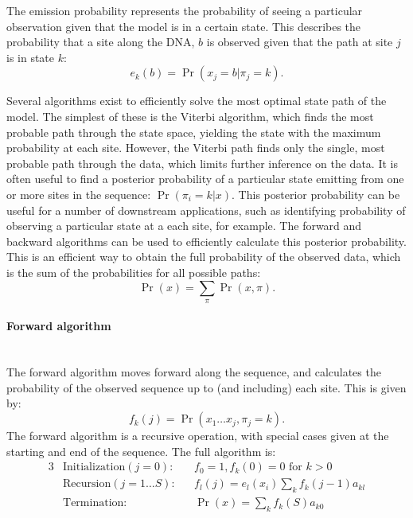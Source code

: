 The emission probability represents the probability of seeing a particular observation given that the model is in a certain state.
This describes the probability that a site along the DNA, $b$ is observed given that the path at site $j$ is in state $k$:
\begin{equation}
    e_k(b) = \Pr( x_j = b | \pi_{j} = k ) .
\end{equation}


Several algorithms exist to efficiently solve the most optimal state path of the model.
The simplest of these is the Viterbi algorithm, which finds the most probable path through the state space, yielding the state with the maximum probability at each site.
However, the Viterbi path finds only the single, most probable path through the data, which limits further inference on the data.
It is often useful to find a posterior probability of a particular state emitting from one or more sites in the sequence:
$\Pr( \pi_i = k | x )$.
This posterior probability can be useful for a number of downstream applications, such as identifying probability of observing a particular state at a each site, for example.
The forward and backward algorithms can be used to efficiently calculate this posterior probability.
This is an efficient way to obtain the full probability of the observed data, which is the sum of the probabilities for all possible paths:
\begin{equation}
    \Pr(x) = \sum_\pi{ \Pr(x,\pi)} .
\end{equation}


\paragraph{Forward algorithm} \mbox{} \\
The forward algorithm moves forward along the sequence, and calculates the probability of the observed sequence up to (and including) each site.
This is given by:
\begin{equation}
    f_k(j) = \Pr( x_1 \dots x_j, \pi_j=k ).
\end{equation}
The forward algorithm is a recursive operation, with special cases given at the starting and end of the sequence.
The full algorithm is:
\begin{alignat*}{3}
    &\text{Initialization} (j=0):    &&f_0=1, f_k(0) = 0 \text{ for } k>0 \\
    &\text{Recursion} (j=1 \dots S): &&f_l(j)= e_l(x_i) \sum_k{ f_k( j-1 ) a_{kl} }  \\
    &\text{Termination}:             &&\Pr(x)= \sum_k{ f_k(S) a_{k0} } \\
\end{alignat*}


